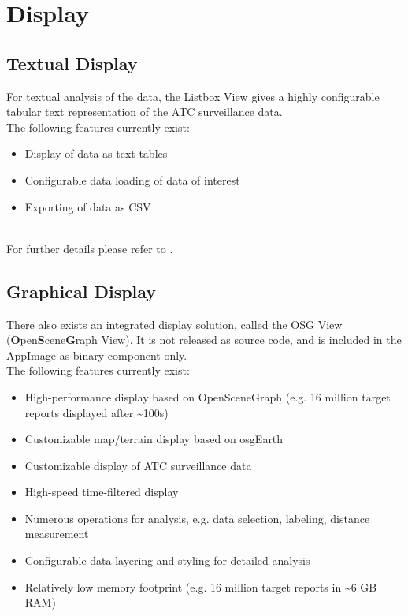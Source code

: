 \section{Display}

\subsection{Textual Display}

For textual analysis of the data, the Listbox View gives a highly configurable tabular text representation of the ATC surveillance data. \\

The following features currently exist:

\begin{itemize}  
\item Display of data as text tables
\item Configurable data loading of data of interest
\item Exporting of data as CSV
\end{itemize} 
\ \\

For further details please refer to .

\subsection{Graphical Display}
There also exists an integrated display solution, called the OSG View (\textbf{O}pen\textbf{S}cene\textbf{G}raph View). It is not released as source code, and is included in the AppImage as binary component only. \\

The following features currently exist:

\begin{itemize}  
\item High-performance display based on OpenSceneGraph (e.g. 16 million target reports displayed after \textasciitilde100s)
\item Customizable map/terrain display based on osgEarth
\item Customizable display of ATC surveillance data
\item High-speed time-filtered display
\item Numerous operations for analysis, e.g. data selection, labeling, distance measurement
\item Configurable data layering and styling for detailed analysis
\item Relatively low memory footprint (e.g. 16 million target reports in \textasciitilde6 GB RAM)
\end{itemize} 
\ \\

